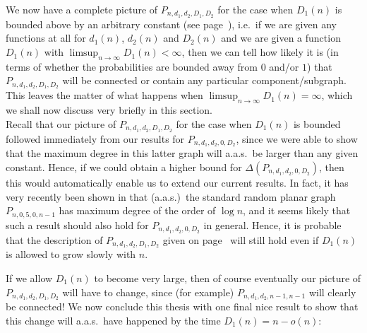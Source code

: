 \documentclass{article}
\newtheorem{Proof of Theorem}{Proof of Theorem}
\begin{document}
We now have a complete picture of $P_{n,d_{1},d_{2},D_{1},D_{2}}$ for the case when $D_{1}(n)$ is bounded
above by an arbitrary constant (see page~\pageref{sum}),
i.e.~if we are given any functions at all for $d_{1}(n)$, $d_{2}(n)$ and $D_{2}(n)$
and we are given a function $D_{1}(n)$ with $\limsup_{n \to \infty} D_{1}(n) < \infty$,
then we can tell how likely it is
(in terms of whether the probabilities are bounded away from $0$ and/or $1$)
that $P_{n,d_{1},d_{2},D_{1},D_{2}}$
will be connected or contain any particular component/subgraph.
This leaves the matter of what happens when $\limsup_{n \to \infty} D_{1}(n) = \infty$,
which we shall now discuss very briefly in this section. \\

Recall that our picture of $P_{n,d_{1},d_{2},D_{1},D_{2}}$
for the case when $D_{1}(n)$ is bounded followed immediately from our results for $P_{n,d_{1},d_{2},0,D_{2}}$,
since we were able to show that the maximum degree in this latter graph will a.a.s.~be larger than any given constant.
Hence,
if we could obtain a higher bound for $\Delta(P_{n,d_{1},d_{2},0,D_{2}})$,
then this would automatically enable us to extend our current results.
In fact,
it has very recently been shown in \cite{mcd2} that (a.a.s.)~the standard random planar graph
$P_{n,0,5,0,n-1}$ has maximum degree of the order of $\log n$,
and it seems likely that such a result should also hold for $P_{n,d_{1},d_{2},0,D_{2}}$ in general.
Hence, it is probable that the description of $P_{n,d_{1},d_{2},D_{1},D_{2}}$
given on page~\pageref{sum} will still hold even if $D_{1}(n)$ is allowed to grow slowly with $n$.

If we allow $D_{1}(n)$ to become very large, 
then of course eventually our picture of $P_{n,d_{1},d_{2},D_{1},D_{2}}$ will have to change,
since (for example) $P_{n,d_{1},d_{2},n-1,n-1}$ will clearly be connected!
We now conclude this thesis with one final nice result
to show that this change will a.a.s.~have happened by the time $D_{1}(n)=n-o(n)$:
\end{document}
